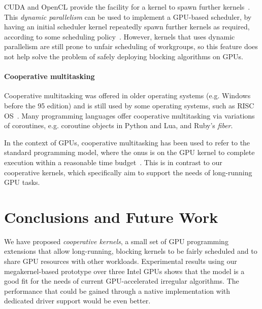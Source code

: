 \documentclass[numbers,nocopyrightspace,10pt]{sigplanconf}
\begin{document}
CUDA and OpenCL provide the facility for a kernel to spawn further kernels~\cite{cuda-75,opencl2Spec}.
This \emph{dynamic parallelism} can be used to implement a
GPU-based scheduler, by having an initial scheduler kernel repeatedly
spawn further kernels as required, according to some scheduling
policy~\cite{DBLP:conf/ppopp/Muyan-OzcelikO16}.  However, kernels
that uses dynamic parallelism are still prone to unfair scheduling of workgroups, so this feature
does not help solve the problem of safely deploying blocking
algorithms on GPUs.

\paragraph{Cooperative multitasking}

Cooperative multitasking was offered in older operating systems
(e.g. Windows before the 95 edition) and is still used by some
operating systems, such as RISC
OS~\cite{risc-os-multitasking}.
Many programming languages offer cooperative multitasking via
variations of coroutines, e.g. coroutine objects in
Python
and Lua,
and Ruby's
\emph{fiber}.

In the context of GPUs, cooperative multitasking has been used to
refer to the standard programming model, where the onus is on the GPU kernel
to complete execution within a reasonable time budget~\cite{adriaens2012case,CPE:CPE1722}.
%
This is in contrast to our cooperative kernels, which specifically aim to support the needs of long-running GPU tasks.


\section{Conclusions and Future Work}\label{sec:conclusion}

We have proposed \emph{cooperative kernels}, a small set of GPU
programming extensions that allow long-running, blocking kernels to be
fairly scheduled and to share GPU resources with other workloads.
Experimental results using our megakernel-based prototype over three
Intel GPUs shows that the model is a good fit for the needs of current
GPU-accelerated irregular algorithms.  The
performance that could be gained through a native implementation with
dedicated driver support would be even better.
\end{document}
